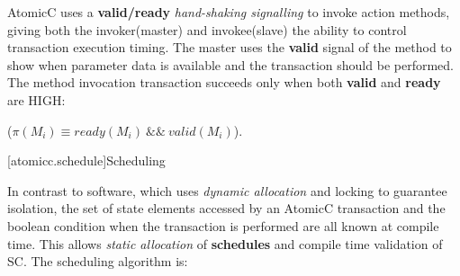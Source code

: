 AtomicC uses a \textbf{valid/ready} \textit{hand-shaking signalling}
\cite{Fletcher2009, AXISpec} to invoke action methods,
giving both the invoker(master) and invokee(slave) the ability to control transaction
execution timing.
The master uses the \textbf{valid} signal
of the method to show when parameter data is available and the transaction should be performed.
The method invocation transaction succeeds only when
both \textbf{valid} and \textbf{ready} are HIGH:

 ($\pi(M_{i}) \equiv ready(M_{i})\ \&\&\ valid(M_{i})$).

[atomicc.schedule]{Scheduling}

In contrast to software, which uses \textit{dynamic allocation}\cite[p.~377]{GrayR93}
and locking\cite[Sec.~11.2]{OV11} to guarantee isolation,
the set of state elements accessed by an AtomicC transaction
and the boolean condition when the transaction is performed
are all known at compile time.
This allows \textit{static allocation}\cite[Sec.~7.3.1]{GrayR93} of \textbf{schedules}
and compile time validation of SC.
The scheduling algorithm is:
